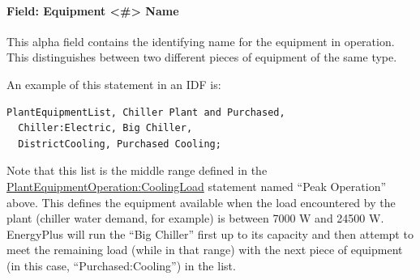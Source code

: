 \paragraph{Field: Equipment \textless{}\#\textgreater{} Name}\label{field-equipment-name-1}

This alpha field contains the identifying name for the equipment in operation. This distinguishes between two different pieces of equipment of the same type.

An example of this statement in an IDF is:

\begin{lstlisting}
PlantEquipmentList, Chiller Plant and Purchased,
  Chiller:Electric, Big Chiller,
  DistrictCooling, Purchased Cooling;
\end{lstlisting}

Note that this list is the middle range defined in the \hyperref[plantequipmentoperationcoolingload]{PlantEquipmentOperation:CoolingLoad} statement named ``Peak Operation'' above. This defines the equipment available when the load encountered by the plant (chiller water demand, for example) is between 7000 W and 24500 W. EnergyPlus will run the ``Big Chiller'' first up to its capacity and then attempt to meet the remaining load (while in that range) with the next piece of equipment (in this case, ``Purchased:Cooling'') in the list.